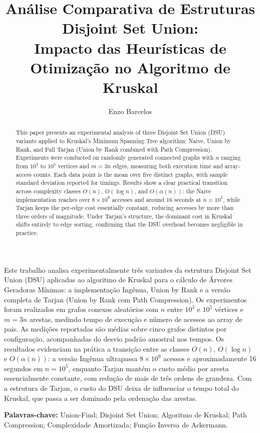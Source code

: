 \documentclass[12pt]{article}
\title{Análise Comparativa de Estruturas Disjoint Set Union:\\Impacto das Heurísticas de Otimização no Algoritmo de Kruskal}
\author{Enzo Barcelos\inst{1}}
\begin{document}
\maketitle

\begin{resumo}
  Este trabalho analisa experimentalmente três variantes da estrutura Disjoint Set Union (DSU) aplicadas ao algoritmo de Kruskal para o cálculo de Árvores Geradoras Mínimas: a implementação Ingênua, Union by Rank e a versão completa de Tarjan (Union by Rank com Path Compression). Os experimentos foram realizados em grafos conexos aleatórios com $n$ entre $10^3$ e $10^5$ vértices e $m = 3n$ arestas, medindo tempo de execução e número de acessos ao array de pais. As medições reportadas são médias sobre cinco grafos distintos por configuração, acompanhadas do desvio padrão amostral nos tempos. Os resultados evidenciam na prática a transição entre as classes $O(n)$, $O(\log n)$ e $O(\alpha(n))$: a versão Ingênua ultrapassa $8 \times 10^9$ acessos e aproximadamente 16 segundos em $n = 10^5$, enquanto Tarjan mantém o custo médio por aresta essencialmente constante, com redução de mais de três ordens de grandeza. Com a estrutura de Tarjan, o custo do DSU deixa de influenciar o tempo total do Kruskal, que passa a ser dominado pela ordenação das arestas.
\end{resumo}

\begin{abstract}
  This paper presents an experimental analysis of three Disjoint Set Union (DSU) variants applied to Kruskal's Minimum Spanning Tree algorithm: Naive, Union by Rank, and Full Tarjan (Union by Rank combined with Path Compression). Experiments were conducted on randomly generated connected graphs with $n$ ranging from $10^3$ to $10^5$ vertices and $m = 3n$ edges, measuring both execution time and array-access counts. Each data point is the mean over five distinct graphs, with sample standard deviation reported for timings. Results show a clear practical transition across complexity classes $O(n)$, $O(\log n)$, and $O(\alpha(n))$: the Naive implementation reaches over $8 \times 10^9$ accesses and around 16 seconds at $n = 10^5$, while Tarjan keeps the per-edge cost essentially constant, reducing accesses by more than three orders of magnitude. Under Tarjan's structure, the dominant cost in Kruskal shifts entirely to edge sorting, confirming that the DSU overhead becomes negligible in practice.
\end{abstract}

\noindent\textbf{Palavras-chave:} Union-Find; Disjoint Set Union; Algoritmo de Kruskal; Path Compression; Complexidade Amortizada; Função Inversa de Ackermann.
\end{document}
